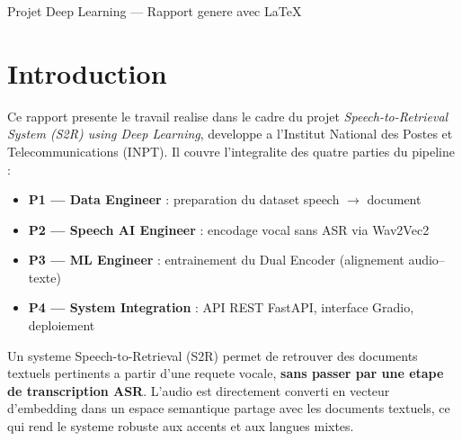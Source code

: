 \documentclass[12pt, a4paper]{article}
\begin{document}
\begin{titlepage}
\begin{center}
    \vfill

    {\small\textcolor{mgray}{Projet Deep Learning --- Rapport genere avec \LaTeX}}
  \end{center}
\end{titlepage}

\pagecolor{white}

\tableofcontents
\newpage

\section{Introduction}

Ce rapport presente le travail realise dans le cadre du projet
\textit{Speech-to-Retrieval System (S2R) using Deep Learning}, developpe a l'Institut
National des Postes et Telecommunications (INPT). Il couvre l'integralite des quatre
parties du pipeline :

\begin{itemize}[leftmargin=1.5cm]
  \item \textbf{P1 --- Data Engineer} : preparation du dataset speech $\rightarrow$ document
  \item \textbf{P2 --- Speech AI Engineer} : encodage vocal sans ASR via Wav2Vec2
  \item \textbf{P3 --- ML Engineer} : entrainement du Dual Encoder (alignement audio--texte)
  \item \textbf{P4 --- System Integration} : API REST FastAPI, interface Gradio, deploiement
\end{itemize}

Un systeme Speech-to-Retrieval (S2R) permet de retrouver des documents textuels pertinents
a partir d'une requete vocale, \textbf{sans passer par une etape de transcription ASR}.
L'audio est directement converti en vecteur d'embedding dans un espace semantique partage
avec les documents textuels, ce qui rend le systeme robuste aux accents et aux langues mixtes.
\end{document}
